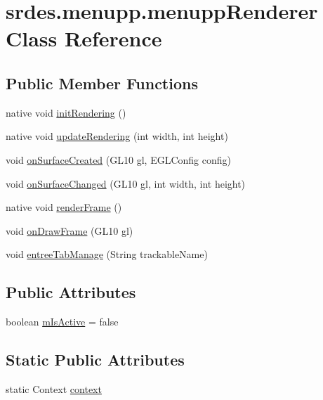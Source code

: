 \hypertarget{classsrdes_1_1menupp_1_1menupp_renderer}{\section{srdes.\-menupp.\-menupp\-Renderer \-Class \-Reference}
\label{classsrdes_1_1menupp_1_1menupp_renderer}
}
\subsection*{\-Public \-Member \-Functions}
\begin{DoxyCompactItemize}
\item 
native void \hyperlink{classsrdes_1_1menupp_1_1menupp_renderer_aa44763988f9e4594913259d84a3a36c5}{init\-Rendering} ()
\item 
native void \hyperlink{classsrdes_1_1menupp_1_1menupp_renderer_af0ab583e41fefaf9965e69d5c50d4fd0}{update\-Rendering} (int width, int height)
\item 
void \hyperlink{classsrdes_1_1menupp_1_1menupp_renderer_a00511e42b4b6789bf3d1c286d82b2b22}{on\-Surface\-Created} (\-G\-L10 gl, \-E\-G\-L\-Config config)
\item 
void \hyperlink{classsrdes_1_1menupp_1_1menupp_renderer_aee6fb14042c11ab5b030f0c83b5f60d9}{on\-Surface\-Changed} (\-G\-L10 gl, int width, int height)
\item 
native void \hyperlink{classsrdes_1_1menupp_1_1menupp_renderer_acac569c6d01adada2f6cfeb49b723df1}{render\-Frame} ()
\item 
void \hyperlink{classsrdes_1_1menupp_1_1menupp_renderer_ab3184c3dc1e30bf5abd13482d3533010}{on\-Draw\-Frame} (\-G\-L10 gl)
\item 
void \hyperlink{classsrdes_1_1menupp_1_1menupp_renderer_ace8fc609436375a0a3d63ca5a2c1ca63}{entree\-Tab\-Manage} (\-String trackable\-Name)
\end{DoxyCompactItemize}
\subsection*{\-Public \-Attributes}
\begin{DoxyCompactItemize}
\item 
boolean \hyperlink{classsrdes_1_1menupp_1_1menupp_renderer_aac98a77c3a7e209e67a8dd87c2b00842}{m\-Is\-Active} = false
\end{DoxyCompactItemize}
\subsection*{\-Static \-Public \-Attributes}
\begin{DoxyCompactItemize}
\item 
static \-Context \hyperlink{classsrdes_1_1menupp_1_1menupp_renderer_a1b41a5085dd3335678efcc6d08fb1497}{context}
\end{DoxyCompactItemize}


